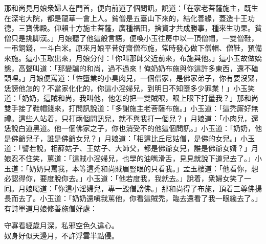那和尚見月娘衆婦人在門首，便向前道了個問訊，說道：「在家老菩薩施主，既生在深宅大院，都是龍華一會上人。貧僧是五臺山下來的，結化善緣，蓋造十王功德，三寶佛殿。仰賴十方施主菩薩，廣種福田，捨資才共成勝事，種來生功果。貧僧只是挑脚漢。」月娘聽了他這般言語，便喚小玉往房中以一頂僧帽，一雙僧鞋，一弔銅錢，一斗白米。原來月娘平昔好齋僧布施，常時發心做下僧帽、僧鞋，預備來施。這小玉取出來，月娘分付：「你叫那師父近前來，布施與他。」這小玉故做嬌態，高聲叫道：「那變驢的和尚，過不過來！{}俺奶奶布施與你這許多東西，還不磕頭哩。」月娘便罵道：「恠墮業的小臭肉兒，一個僧家，是佛家弟子，你有要沒緊，恁謗他怎的？不當家化化的，你這小淫婦兒，到明日不知墮多少罪業！」小玉笑道：「奶奶，這賊和尚，我叫他，他怎的把一雙賊眼，眼上眼下打量我？」那和尚雙手接了鞋帽錢來，打問訊說道：「多謝施主老菩薩布施。」小玉道：「這禿厮好無禮。這些人站着，只打兩個問訊兒，就不與我打一個兒？」月娘道：「小肉兒，還恁說白道黑道。他一個佛家之子，你也消受不的他這個問訊。」小玉道：「奶奶，他是佛爺兒子，誰是佛爺女兒？」{}月娘道：「相這比丘尼姑僧，是佛的女兒。」小玉道：「譬若說，相薛姑子、王姑子、大師父，都是佛爺女兒，誰是佛爺女婿？」月娘忍不住笑，罵道：「這賊小淫婦兒，也學的油嘴滑舌，見見就說下道兒去了。」小玉道：「奶奶只罵我，本等這禿和尚賊眉豎眼的只看我。」{}孟玉樓道：「他看你，想必認得你，要度脫你去。」小玉道：「他若度我，我就去。」說着，衆婦女笑了一囘。月娘喝道：「你這小淫婦兒，專一毀僧謗佛。」那和尚得了布施，頂着三尊佛揚長而去了。小玉道：「奶奶還嗔我罵他，你看這賊禿，臨去還看了我一眼纔去了。」有詩單道月娘修善施僧好處：

\begin{myquote}
守寡看經歲月深，私邪空色久違心。\\奴身好似天邊月，不許浮雲半點侵。
\end{myquote}

